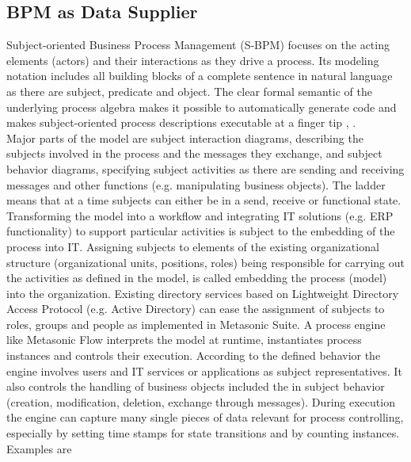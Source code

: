\subsection{BPM as Data Supplier}
Subject-oriented Business Process Management (S-BPM) focuses on the acting elements (actors) and their interactions as they drive a process. Its modeling notation includes all building blocks of a complete sentence in natural language as there are subject, predicate and object. The clear formal semantic of the underlying process algebra makes it possible to automatically generate code and makes subject-oriented process descriptions executable at a finger tip \cite{Flei12}, \cite{article:HMD-S-BPM}.
\\
Major parts of the model are subject interaction diagrams, describing the subjects involved in the process and the messages they exchange, and subject behavior diagrams, specifying subject activities as there are sending and receiving messages and other functions (e.g. manipulating business objects). The ladder means that at a time subjects can either be in a send, receive or functional state.
Transforming the model into a workflow and integrating IT solutions (e.g. ERP functionality) to support particular activities is subject to the embedding of the process into IT. Assigning subjects to elements of the existing organizational structure (organizational units, positions, roles) being responsible for carrying out the activities as defined in the model, is called embedding the process (model) into the organization. Existing directory services based on Lightweight Directory Access Protocol (e.g. Active Directory) can ease the assignment of subjects to roles, groups and people as implemented in Metasonic Suite.
A process engine like Metasonic Flow interprets the model at runtime, instantiates process instances and controls their execution. According to the defined behavior the engine involves users and IT services or applications as subject representatives. It also controls the handling of business objects included the in subject behavior (creation, modification, deletion, exchange through messages). During execution the engine can capture many single pieces of data relevant for process controlling, especially by setting time stamps for state transitions and by counting instances. Examples are

